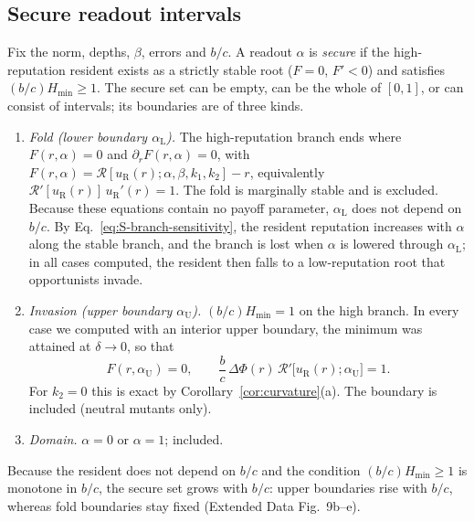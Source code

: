 \documentclass[fleqn,10pt]{article}
\theoremstyle{plain}
\theoremstyle{remark}
\newcommand{\EDSecurity}{9}
\newcommand{\Rm}{\mathcal R}
\begin{document}
\subsection{Secure readout intervals}
Fix the norm, depths, $\beta$, errors and $b/c$. A readout $\alpha$ is
\emph{secure} if the high-reputation resident exists as a strictly stable root
($F=0$, $F'<0$) and satisfies $(b/c)H_{\min}\ge1$. The secure set can be empty,
can be the whole of $[0,1]$, or can consist of intervals; its boundaries are of
three kinds.
\begin{enumerate}
\item \emph{Fold (lower boundary $\alpha_{\mathrm L}$).} The high-reputation branch
ends where $F(r,\alpha)=0$ and $\partial_rF(r,\alpha)=0$, with
$F(r,\alpha)=\Rm[u_{\mathrm R}(r);\alpha,\beta,k_1,k_2]-r$, equivalently
$\Rm'[u_{\mathrm R}(r)]\,u_{\mathrm R}'(r)=1$. The fold is marginally stable and is
excluded. Because these equations contain no payoff parameter, $\alpha_{\mathrm L}$
does not depend on $b/c$. By Eq.~\eqref{eq:S-branch-sensitivity}, the resident
reputation increases with $\alpha$ along the stable branch, and the branch is
lost when $\alpha$ is lowered through $\alpha_{\mathrm L}$; in all cases computed,
the resident then falls to a low-reputation root that opportunists invade.
\item \emph{Invasion (upper boundary $\alpha_{\mathrm U}$).} $(b/c)H_{\min}=1$ on the
high branch. In every case we computed with an interior upper boundary, the
minimum was attained at $\delta\to0$, so that
\begin{equation}
F(r,\alpha_{\mathrm U})=0,\qquad
\frac bc\,\Delta\Phi(r)\,\Rm'\bigl[u_{\mathrm R}(r);\alpha_{\mathrm U}\bigr]=1 .
\label{eq:S-alphaU}
\end{equation}
For $k_2=0$ this is exact by Corollary~\ref{cor:curvature}(a). The boundary is
included (neutral mutants only).
\item \emph{Domain.} $\alpha=0$ or $\alpha=1$; included.
\end{enumerate}
Because the resident does not depend on $b/c$ and the condition
$(b/c)H_{\min}\ge1$ is monotone in $b/c$, the secure set grows with $b/c$: upper
boundaries rise with $b/c$, whereas fold boundaries stay fixed (Extended Data
Fig.~\EDSecurity b--e).
\end{document}
